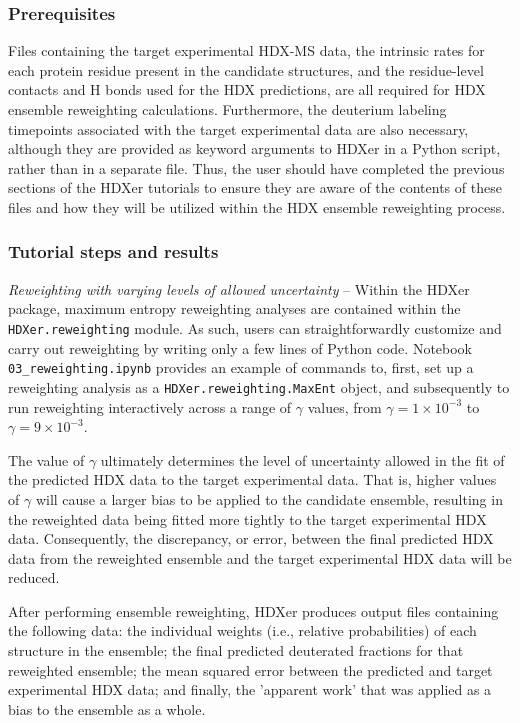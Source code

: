 \documentclass[9pt,tutorial]{livecoms}
\begin{document}
\subsubsection{Prerequisites}

Files containing the target experimental HDX-MS data, the intrinsic rates for each protein residue present in the candidate structures, and the residue-level contacts and H bonds used for the HDX predictions, are all required for HDX ensemble reweighting calculations.
Furthermore, the deuterium labeling timepoints associated with the target experimental data are also necessary, although they are provided as keyword arguments to HDXer in a Python script, rather than in a separate file.
Thus, the user should have completed the previous sections of the HDXer tutorials to ensure they are aware of the contents of these files and how they will be utilized within the HDX ensemble reweighting process.

\subsubsection{Tutorial steps and results}

\noindent
\textit{Reweighting with varying levels of allowed uncertainty} -- Within the HDXer package, maximum entropy reweighting analyses are contained within the \texttt{HDXer.reweighting} module.
As such, users can straightforwardly customize and carry out reweighting by writing only a few lines of Python code.
Notebook \texttt{03\_reweighting.ipynb} provides an example of commands to, first, set up a reweighting analysis as a \texttt{HDXer.reweighting.MaxEnt} object, and subsequently to run reweighting interactively across a range of $\gamma$ values, from $\gamma = 1\times10^{-3}$ to $\gamma = 9\times10^{-3}$.

The value of $\gamma$ ultimately determines the level of uncertainty allowed in the fit of the predicted HDX data to the target experimental data. 
That is, higher values of $\gamma$ will cause a larger bias to be applied to the candidate ensemble, resulting in the reweighted data being fitted more tightly to the target experimental HDX data. 
Consequently, the discrepancy, or error, between the final predicted HDX data from the reweighted ensemble and the target experimental HDX data will be reduced.

After performing ensemble reweighting, HDXer produces output files containing the following data: the individual weights (i.e., relative probabilities) of each structure in the ensemble; the final predicted deuterated fractions for that reweighted ensemble; the mean squared error between the predicted and target experimental HDX data; and finally, the 'apparent work' that was applied as a bias to the ensemble as a whole.
\end{document}
